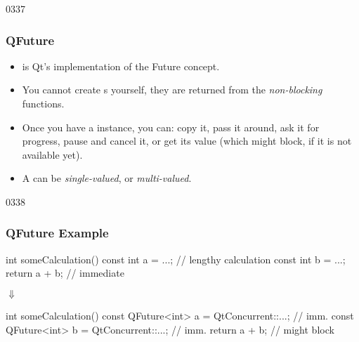 \begin{slide}{0337}
\frametitle{QFuture}\label{QFuture}
  \begin{itemize}
  \item {} is Qt's implementation of the Future concept.
  \item You cannot create s yourself, they are returned
    from the \emph{non-blocking}  functions.
  \item Once you have a  instance, you can: copy it,
    pass it around, ask it for progress, pause and cancel it, or get
    its value (which might block, if it is not available yet).
  \item A  can be \emph{single-valued}, or
    \emph{multi-valued}.
  \end{itemize}
\end{slide}
\begin{slide}[fragile]{0338}
\frametitle{QFuture Example}
\begin{center}
\begin{cpp}
int someCalculation() {
  const int a = ...; // lengthy calculation
  const int b = ...;
  return a + b; // immediate
}
\end{cpp}
{\Huge$\Downarrow$}
\begin{cpp}
int someCalculation() {
  const QFuture<int> a = QtConcurrent::...; // imm.
  const QFuture<int> b = QtConcurrent::...; // imm.
  return a + b; // might block
}
\end{cpp}
\end{center}
\end{slide}
